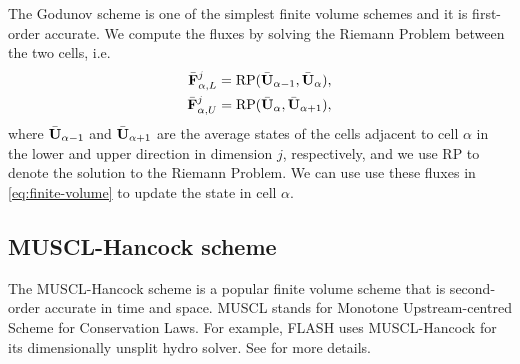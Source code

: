 \documentclass{article}
\begin{document}
The Godunov scheme is one of the simplest finite volume schemes and it is first-order
accurate. We compute the fluxes by solving the Riemann Problem between the two cells, i.e.
\begin{align}
\bar{\mathrm{\bf F}}^j_{\alpha,L} = \text{RP}(\bar{\mathrm{\bf U}}_{\alpha-1}, \bar{\mathrm{\bf U}}_\alpha), \\
\bar{\mathrm{\bf F}}^j_{\alpha,U} = \text{RP}(\bar{\mathrm{\bf U}}_\alpha, \bar{\mathrm{\bf U}}_{\alpha+1}),
\end{align}
where $\bar{\mathrm{\bf U}}_{\alpha-1}$ and $\bar{\mathrm{\bf U}}_{\alpha+1}$ are the average states of the cells
adjacent to cell $\alpha$ in the lower and upper direction in dimension $j$, respectively,
and we use RP to denote the solution to the Riemann Problem. We can use use these fluxes in
\cref{eq:finite-volume} to update the state in cell $\alpha$.


\subsection{MUSCL-Hancock scheme}

The MUSCL-Hancock scheme is a popular finite volume scheme that is second-order accurate in time and
space. MUSCL stands for Monotone Upstream-centred Scheme for Conservation Laws. For example, FLASH
uses MUSCL-Hancock for its dimensionally unsplit hydro solver. See
\cite[\S13.4, \S14.4, \S16.5]{toro} for more details.
\end{document}
